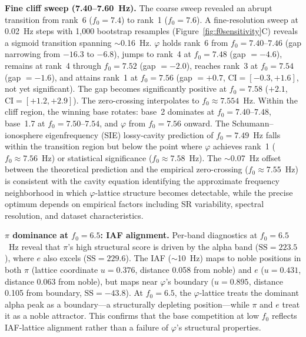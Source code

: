 \documentclass[11pt,a4paper]{article}
\newcommand{\phisym}{\varphi}
\newcommand{\fzero}{f_0}
\begin{document}
\textbf{Fine cliff sweep (7.40--7.60~Hz).} The coarse sweep revealed an abrupt transition from rank~6 ($\fzero = 7.4$) to rank~1 ($\fzero = 7.6$). A fine-resolution sweep at 0.02~Hz steps with 1,000 bootstrap resamples (Figure~\ref{fig:f0sensitivity}C) reveals a sigmoid transition spanning $\sim$0.16~Hz. $\phisym$ holds rank~6 from $\fzero = 7.40$--$7.46$ (gap narrowing from $-16.3$ to $-6.8$), jumps to rank~4 at $\fzero = 7.48$ (gap $= -4.6$), remains at rank~4 through $\fzero = 7.52$ (gap $= -2.0$), reaches rank~3 at $\fzero = 7.54$ (gap $= -1.6$), and attains rank~1 at $\fzero = 7.56$ (gap $= +0.7$, $\text{CI} = [-0.3, +1.6]$, not yet significant). The gap becomes significantly positive at $\fzero = 7.58$ ($+2.1$, $\text{CI} = [+1.2, +2.9]$). The zero-crossing interpolates to $\fzero \approx 7.554$~Hz. Within the cliff region, the winning base rotates: base~2 dominates at $\fzero = 7.40$--$7.48$, base~1.7 at $\fzero = 7.50$--$7.54$, and $\phisym$ from $\fzero = 7.56$ onward. The Schumann--ionosphere eigenfrequency (SIE) lossy-cavity prediction of $\fzero = 7.49$~Hz falls within the transition region but below the point where $\phisym$ achieves rank~1 ($\fzero \approx 7.56$~Hz) or statistical significance ($\fzero \approx 7.58$~Hz). The $\sim$0.07~Hz offset between the theoretical prediction and the empirical zero-crossing ($\fzero \approx 7.55$~Hz) is consistent with the cavity equation identifying the approximate frequency neighborhood in which $\phisym$-lattice structure becomes detectable, while the precise optimum depends on empirical factors including SR variability, spectral resolution, and dataset characteristics.

\textbf{$\pi$ dominance at $\fzero = 6.5$: IAF alignment.} Per-band diagnostics at $\fzero = 6.5$~Hz reveal that $\pi$'s high structural score is driven by the alpha band ($\text{SS} = 223.5$), where $e$ also excels ($\text{SS} = 229.6$). The IAF ($\sim$10~Hz) maps to noble positions in both $\pi$ (lattice coordinate $u = 0.376$, distance 0.058 from noble) and $e$ ($u = 0.431$, distance 0.063 from noble), but maps near $\phisym$'s boundary ($u = 0.895$, distance 0.105 from boundary, $\text{SS} = -43.8$). At $\fzero = 6.5$, the $\phisym$-lattice treats the dominant alpha peak as a boundary---a structurally depleting position---while $\pi$ and $e$ treat it as a noble attractor. This confirms that the base competition at low $\fzero$ reflects IAF-lattice alignment rather than a failure of $\phisym$'s structural properties.
\end{document}
